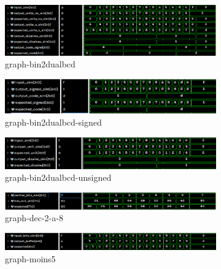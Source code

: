 \begin{figure}[H]
  \centering
	\begin{subfigure}{.496\linewidth}
		\centering
		\includegraphics[width=\textwidth]{assets/img/graph-bin2dualbcd.png}
		\caption{graph-bin2dualbcd}
	\end{subfigure}
	\begin{subfigure}{.496\linewidth}
		\centering
		\includegraphics[width=\textwidth]{assets/img/graph-bin2dualbcd-signed.png}
		\caption{graph-bin2dualbcd-signed}
	\end{subfigure}
	\begin{subfigure}{.496\linewidth}
		\centering
		\includegraphics[width=\textwidth]{assets/img/graph-bin2dualbcd-unsigned.png}
		\caption{graph-bin2dualbcd-unsigned}
	\end{subfigure}
	\begin{subfigure}{.496\linewidth}
		\centering
		\includegraphics[width=\textwidth]{assets/img/graph-dec-2-a-8.png}
		\caption{graph-dec-2-a-8}
	\end{subfigure}
	\begin{subfigure}{.496\linewidth}
		\centering
		\includegraphics[width=\textwidth]{assets/img/graph-moins5.png}
		\caption{graph-moins5}
	\end{subfigure}
	\begin{subfigure}{.496\linewidth}

\end{subfigure}
\end{figure}
